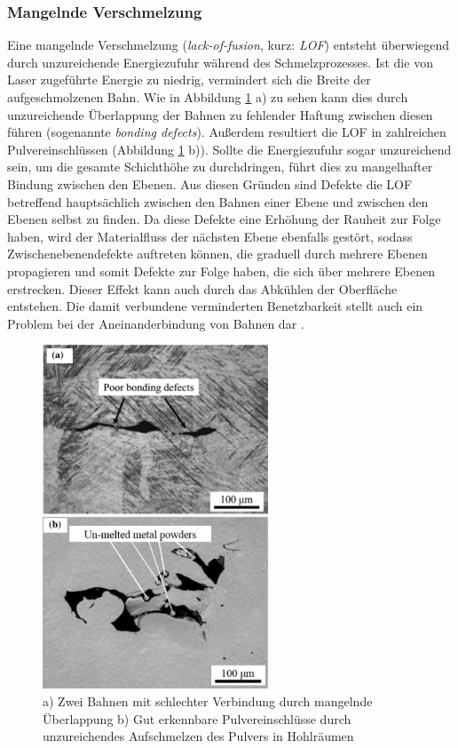 		\subsubsection{Mangelnde Verschmelzung}
		Eine mangelnde Verschmelzung (\emph{lack-of-fusion}, kurz: \emph{LOF}) entsteht
		überwiegend durch unzureichende Energiezufuhr während des Schmelzprozesses. Ist die von
		Laser zugeführte Energie zu niedrig, vermindert sich die Breite der aufgeschmolzenen Bahn.
		Wie in Abbildung \ref{fig:defects_lof} a) zu sehen kann dies durch unzureichende
		Überlappung der Bahnen zu fehlender Haftung zwischen diesen führen (sogenannte
		\emph{bonding defects}). Außerdem resultiert die LOF in zahlreichen Pulvereinschlüssen
		(Abbildung \ref{fig:defects_lof} b)). Sollte die Energiezufuhr sogar unzureichend sein,
		um die gesamte Schichthöhe zu durchdringen, führt dies zu mangelhafter Bindung zwischen
		den Ebenen. Aus diesen Gründen sind Defekte die LOF betreffend hauptsächlich zwischen
		den Bahnen einer Ebene und zwischen den Ebenen selbst zu finden. Da diese Defekte eine
		Erhöhung der Rauheit zur Folge haben, wird der Materialfluss der nächsten Ebene ebenfalls
		gestört, sodass Zwischenebenendefekte auftreten können, die graduell durch mehrere Ebenen
		propagieren und somit Defekte zur Folge haben, die sich über mehrere Ebenen erstrecken.
		Dieser Effekt kann auch durch das Abkühlen der Oberfläche entstehen. Die damit verbundene
		verminderten Benetzbarkeit stellt auch ein Problem bei der Aneinanderbindung von Bahnen
		dar \cite{zhang2017defect}.

		\begin{figure}[!ht]
			\centering
			\includegraphics[width=0.6\textwidth]{chapter/main/theory/img/defects/lack_of_fusion.png}
			\caption{a) Zwei Bahnen mit schlechter Verbindung durch mangelnde Überlappung
			b) Gut erkennbare Pulvereinschlüsse durch unzureichendes Aufschmelzen des Pulvers
			in Hohlräumen \cite{zhang2017defect}}
			\label{fig:defects_lof}
		\end{figure}

